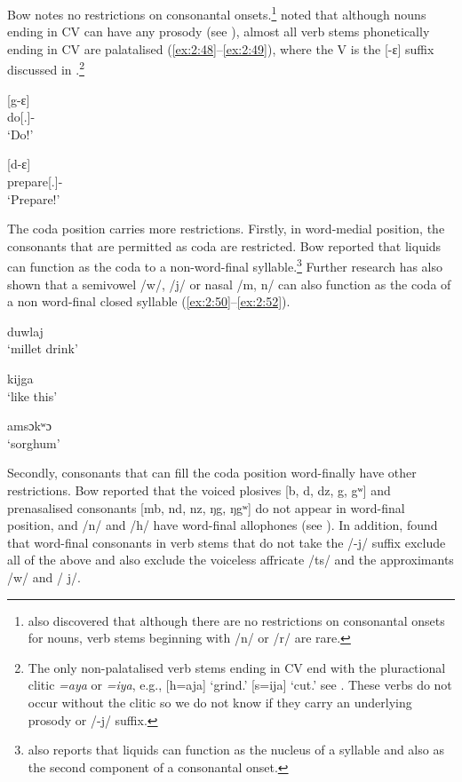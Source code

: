 Bow notes no restrictions on consonantal onsets.\footnote{\citet{FriesenMamalis2008} also discovered that although there are no restrictions on consonantal onsets for nouns, verb stems beginning with /n/ or /r/ are rare.} \cite{FriesenMamalis2008} noted that although nouns ending in CV can have any prosody (see ), almost all verb stems phonetically ending in CV are palatalised (\ref{ex:2:48}--\ref{ex:2:49}), where the V is the [\textit{{}}-ɛ] suffix discussed in .\footnote{The only non-palatalised verb stems ending in CV end with the pluractional clitic \textit{=aya} or \textit{=iya}, e.g., [h=aja] ‘grind.’ [s=ija] ‘cut.’ see .  These verbs do not occur without the clitic so we do not know if they carry an underlying prosody or /-j/ suffix.} 

\ea \label{ex:2:48}
 [g-ɛ] \\
      do[{\twoS}.{\IMP}]-{\CL}\\
\glt  ‘Do!’
\z

\ea \label{ex:2:49}
[d-ɛ]\\
      prepare[{\twoS}.{\IMP}]-{\CL}\\
\glt  ‘Prepare!’
\z

The coda position carries more restrictions. Firstly, in word-medial position, the consonants that are permitted as coda are restricted. Bow reported that liquids can function as the coda to a non-word-final syllable.\footnote{\citet{Bow1997c} also reports that liquids can function as the nucleus of a syllable and also as the second component of a consonantal onset.} Further research has also shown that a semivowel /w/, /j/ or nasal /m, n/ can also function as the coda of a non word-final closed syllable (\ref{ex:2:50}--\ref{ex:2:52}).

\ea \label{ex:2:50}
duwlaj\\
\glt  ‘millet drink’
\z


\ea \label{ex:2:51}
kijga\\
\glt  ‘like this’
\z

\ea \label{ex:2:52}
amsɔkʷɔ\\
\glt  ‘sorghum’
\z

Secondly, consonants that can fill the coda position word-finally have other restrictions. Bow reported that the voiced plosives [b, d, dz, g, gʷ] and prenasalised consonants [mb, nd, nz, ŋg, ŋgʷ] do not appear in word-final position, and /n/ and /h/ have word-final allophones (see ). In addition, \citet{FriesenMamalis2008} found that word-final consonants in verb stems that do not take the /-j/ suffix exclude all of the above and also exclude the voiceless affricate /ts/ and the approximants /w/ and / j/.  

